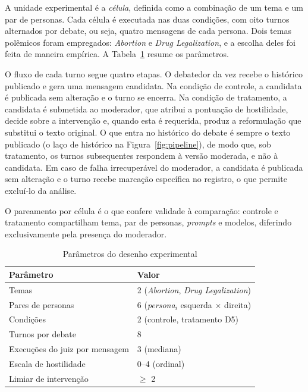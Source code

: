 \documentclass[conference]{IEEEtran} \IEEEoverridecommandlockouts %
\begin{document}
A unidade experimental é a \textit{célula}, definida como a combinação de um
tema e um par de personas. Cada célula é executada nas duas condições, com
oito turnos alternados por debate, ou seja, quatro mensagens de cada persona. Dois
temas polêmicos foram empregados: \textit{Abortion} e \textit{Drug
Legalization}, e a escolha deles foi feita de maneira empírica. A Tabela~\ref{tab:desenho} resume os parâmetros.

O fluxo de cada turno segue quatro etapas. O debatedor da vez recebe o
histórico publicado e gera uma mensagem candidata. Na condição de controle, a
candidata é publicada sem alteração e o turno se encerra. Na condição de
tratamento, a candidata é submetida ao moderador, que atribui a pontuação de
hostilidade, decide sobre a intervenção e, quando esta é requerida, produz a
reformulação que substitui o texto original. O que entra no histórico do debate
é sempre o texto publicado (o laço de histórico na
Figura~\ref{fig:pipeline}), de modo que, sob tratamento, os turnos
subsequentes respondem à versão moderada, e não à candidata. Em caso de falha
irrecuperável do moderador, a candidata é publicada sem alteração e o turno
recebe marcação específica no registro, o que permite excluí-lo da análise.

O pareamento por célula é o que confere validade à comparação: controle e
tratamento compartilham tema, par de personas, \textit{prompts} e modelos, diferindo
exclusivamente pela presença do moderador.

\begin{table}[htbp]
\caption{Parâmetros do desenho experimental}
\begin{center}
\begin{tabular}{@{}ll@{}}
\toprule
\textbf{Parâmetro} & \textbf{Valor} \\
\midrule
Temas & 2 (\textit{Abortion}, \textit{Drug Legalization}) \\
Pares de personas & 6 (\textit{persona}$_i$ esquerda $\times$ direita) \\
Condições & 2 (controle, tratamento D5) \\
Turnos por debate & 8 \\
Execuções do juiz por mensagem & 3 (mediana) \\
Escala de hostilidade & 0--4 (ordinal) \\
Limiar de intervenção & $\geq$ 2 \\
\bottomrule
\end{tabular}
\label{tab:desenho}
\end{center}
\end{table}
\end{document}

